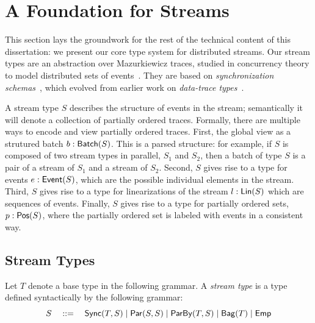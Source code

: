 \chapter{A Foundation for Streams}
\label{cha:foundation}

This section lays the groundwork for the rest of the technical content of this dissertation: we present our core type system for distributed streams.
Our stream types are an abstraction over Mazurkiewicz traces, studied in concurrency theory to model distributed sets of events~\cite{mazurkiewicz1986trace,DiekertR1995}.
They are based on \emph{synchronization schemas}~, which evolved from earlier work on \emph{data-trace types}~.

A stream type $S$ describes the structure of events in the stream;
semantically it will denote a collection of partially ordered traces.
Formally, there are multiple ways to encode and view partially ordered traces.
First, the global view as a strutured batch $b: \mathsf{Batch}({S})$.
This is a parsed structure: for example, if $S$ is composed of two stream types in parallel, $S_1$ and $S_2$, then a batch of type $S$ is a pair of a stream of $S_1$ and a stream of $S_2$.
Second, $S$ gives rise to a type for events $e: \mathsf{Event}({S})$,
which are the possible individual elements in the stream.
Third, $S$ gives rise to a type for linearizations of the stream $l: \mathsf{Lin}({S})$
which are sequences of events.
Finally, $S$ gives rise to a type for partially ordered sets,
$p: \mathsf{Pos}({S})$, where the partially ordered set is labeled with events in a consistent way.

\section{Stream Types}

\begin{definition}
Let $T$ denote a base type in the following grammar.
A \emph{stream type} is a type defined syntactically by the following grammar:
\[
  S \quad ::= \quad
    \mathsf{Sync}({T}, S) \mid
    \mathsf{Par}({S}, {S}) \mid
    \mathsf{ParBy}({T}, S) \mid
    \mathsf{Bag}({T}) \mid
    \mathsf{Emp}{}
\]
\end{definition}

